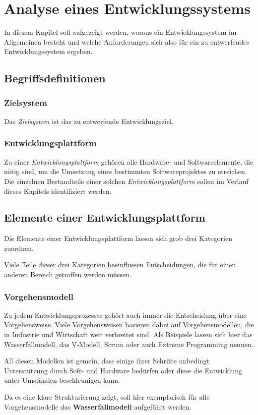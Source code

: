 \chapter{Analyse eines Entwicklungssystems}\label{chap:analyse}
\minitoc
In diesem Kapitel soll aufgezeigt werden, woraus ein Entwicklungssystem
im Allgemeinen besteht und welche Anforderungen sich also für ein zu
entwerfendes Entwicklungssystem ergeben.
\section{Begriffsdefinitionen}
\subsection*{Zielsystem}
Das \emph{Zielsystem} ist das zu entwerfende Entwicklungsziel.
\subsection*{Entwicklungsplattform}
Zu einer \emph{Entwicklungsplattform} gehören alle Hardware- und
Softwareelemente, die nötig sind, um die Umsetzung eines bestimmten
Softwareprojektes zu erreichen. Die einzelnen Bestandteile einer solchen
\emph{Entwicklungsplattform} sollen im Verlauf dieses Kapitels identifiziert
werden.
\section{Elemente einer Entwicklungsplattform}
Die Elemente einer Entwicklungsplattform lassen sich grob drei Kategorien
zuordnen. 

Viele Teile dieser drei Kategorien beeinflussen Entscheidungen, die für
einen anderen Bereich getroffen werden müssen.
\subsection{Vorgehensmodell}
Zu jedem Entwicklungsprozesses gehört auch immer die Entscheidung über eine
Vorgehensweise. Viele Vorgehensweisen basieren dabei auf Vorgehensmodellen,
die in Industrie und Wirtschaft weit verbreitet sind. Als Beispiele lassen sich
hier das Wasserfallmodell, das V-Modell, Scrum oder auch Extreme Programming
nennen.

All diesen Modellen ist gemein, dass einige ihrer Schritte
unbedingt Unterstützung durch Soft- und Hardware bedürfen oder
diese die Entwicklung unter Umständen beschleunigen kann.

Da es eine klare Strukturierung zeigt, soll hier exemplarisch für alle
Vorgehensmodelle das \textbf{Wasserfallmodell} aufgeführt werden.

